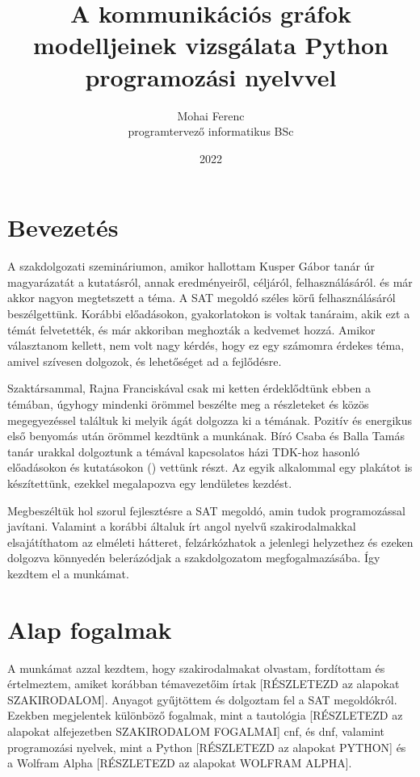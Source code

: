 \documentclass[
]{thesis-ekf}
\theoremstyle{definition}
\theoremstyle{remark}
\begin{document}
	\title{A kommunikációs gráfok modelljeinek vizsgálata Python programozási nyelvvel}
	\author{Mohai Ferenc\\programtervező informatikus BSc}
	\date{2022}
	
	\maketitle
	\tableofcontents
	
	\chapter*{Bevezetés}
	A szakdolgozati szemináriumon, amikor hallottam Kusper Gábor tanár úr magyarázatát a kutatásról, annak eredményeiről, céljáról, felhasználásáról. és már akkor nagyon megtetszett a téma. A SAT megoldó széles körű felhasználásáról beszélgettünk. Korábbi előadásokon, gyakorlatokon is voltak tanáraim, akik ezt a témát felvetették, és már akkoriban meghozták a kedvemet hozzá. Amikor választanom kellett, nem volt nagy kérdés, hogy ez egy számomra érdekes téma, amivel szívesen dolgozok, és lehetőséget ad a fejlődésre.

	Szaktársammal, Rajna Franciskával csak mi ketten érdeklődtünk ebben a témában, úgyhogy mindenki örömmel beszélte meg a részleteket és közös megegyezéssel találtuk ki melyik ágát dolgozza ki a témának. Pozitív és energikus első benyomás után örömmel kezdtünk a munkának. Bíró Csaba és Balla Tamás tanár urakkal dolgoztunk a témával kapcsolatos házi TDK-hoz hasonló előadásokon és kutatásokon (\cite[ICAI2020, AM2020]{am}) vettünk részt. Az egyik alkalommal egy plakátot is készítettünk, ezekkel megalapozva egy lendületes kezdést.
	
	Megbeszéltük hol szorul fejlesztésre a SAT megoldó, amin tudok programozással javítani. Valamint a korábbi általuk írt angol nyelvű szakirodalmakkal elsajátíthatom az elméleti hátteret, felzárkózhatok a jelenlegi helyzethez és ezeken dolgozva könnyedén belerázódjak a szakdolgozatom megfogalmazásába. Így kezdtem el a munkámat.
	
	\chapter{Alap fogalmak}
	
	A munkámat azzal kezdtem, hogy szakirodalmakat olvastam, fordítottam és értelmeztem, amiket korábban témavezetőim írtak [RÉSZLETEZD az alapokat SZAKIRODALOM]. Anyagot gyűjtöttem és dolgoztam fel a SAT megoldókról. Ezekben megjelentek különböző fogalmak, mint a tautológia [RÉSZLETEZD az alapokat alfejezetben SZAKIRODALOM FOGALMAI] cnf, és dnf, valamint programozási nyelvek, mint a Python [RÉSZLETEZD az alapokat PYTHON] és a Wolfram Alpha [RÉSZLETEZD az alapokat WOLFRAM ALPHA].
	
\end{document}
